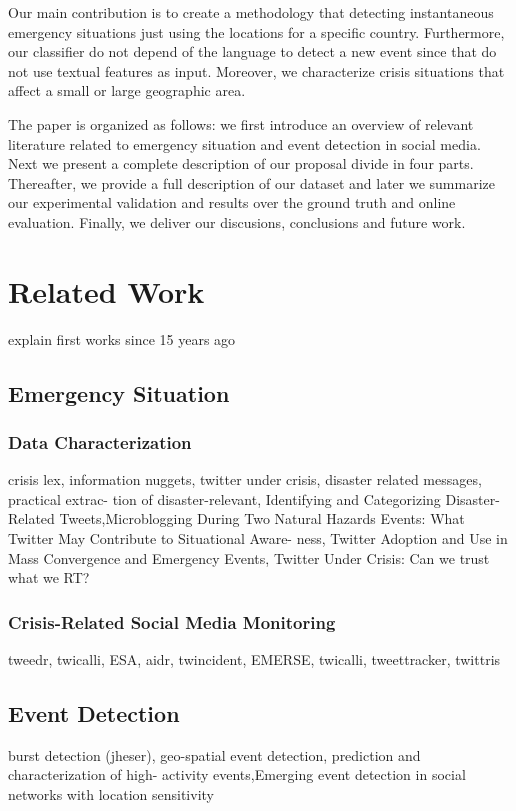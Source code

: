 \documentclass[sigconf]{acmart}
\begin{document}
Our main contribution is to create a methodology that detecting instantaneous emergency situations just using the locations for a specific country. Furthermore, our classifier do not depend of the language to detect a new event since that do not use textual features as input. Moreover, we characterize crisis situations that affect a small or large geographic area.

The paper is organized as follows: we first introduce an overview of relevant literature related to emergency situation and event detection in social media. Next we present a complete description of our proposal divide in four parts. Thereafter, we provide a full description of our dataset and later we summarize our experimental validation and results over the ground truth and online evaluation. Finally, we deliver our discusions, conclusions and future work.



\section{Related Work}
explain first works since 15 years ago
\subsection{Emergency Situation}
\subsubsection{Data Characterization}
crisis lex, information nuggets, twitter under crisis, disaster related messages, practical extrac-
tion of disaster-relevant, Identifying and Categorizing Disaster-Related Tweets,Microblogging
During Two Natural Hazards Events: What Twitter May Contribute to Situational Aware-
ness, Twitter Adoption and Use in Mass Convergence and Emergency Events, Twitter Under
Crisis: Can we trust what we RT?

\subsubsection{Crisis-Related Social Media Monitoring}
tweedr, twicalli, ESA, aidr, twincident, EMERSE, twicalli, tweettracker, twittris

\subsection{Event Detection}
burst detection (jheser), geo-spatial event detection, prediction and characterization of high-
activity events,Emerging event detection in social networks with location sensitivity
\end{document}
